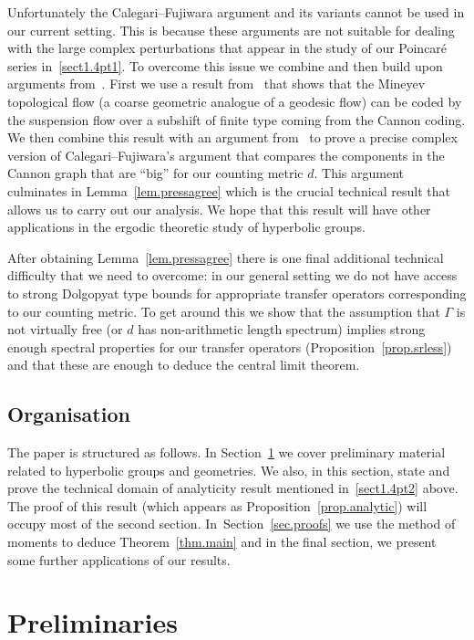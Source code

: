 \documentclass[10pt]{amsart}
\theoremstyle{definition}\newtheorem{defi}[theo]{Definition}\newtheorem{rema}[theo]{Remark}\newtheorem{exam}[theo]{Example}\newtheorem{exem}[theo]{Example}\newtheorem{nota}[theo]{Notation}
\newcommand{\G}{\Gamma}
\theoremstyle{plain}
\begin{document}
Unfortunately the Calegari--Fujiwara argument and its variants cannot be used in our current setting. This is because these arguments are not suitable for dealing with the large complex perturbations that appear in the study of our Poincaré series in~\eqref{sect1.4pt1}. To overcome this issue we combine and then build upon arguments from~\cite{cantrell,cantrell.tanaka.2}. First we use a result from~\cite{cantrell.tanaka.2} that shows that the Mineyev topological flow (a coarse geometric analogue of a geodesic flow) can be coded by the suspension flow over a subshift of finite type coming from the Cannon coding. We then combine this result with an argument from~\cite{cantrell} to prove a precise complex version of Calegari--Fujiwara's argument that compares the components in the {Cannon graph} that are ``big'' for our counting metric $d$. This argument culminates in Lemma~\ref{lem.pressagree} which is the crucial technical result that allows us to carry out our analysis. We hope that this result will have other applications in the ergodic theoretic study of hyperbolic groups.


After obtaining Lemma~\ref{lem.pressagree} there is one final additional technical difficulty that we need to overcome: in our general setting we do not have access to strong Dolgopyat type bounds for appropriate transfer operators corresponding to our counting metric. To get around this we show that the assumption that $\G$ is not virtually free (or $d$ has non-arithmetic length spectrum) implies strong enough spectral properties for our transfer operators (Proposition~\ref{prop.srless}) and that these are enough to deduce the central limit theorem.

\subsection*{Organisation}

The paper is structured as follows. In Section~\ref{sect2} we cover preliminary material related to hyperbolic groups and geometries. We also, in this section, state and prove the technical domain of analyticity result mentioned in~\eqref{sect1.4pt2} above. The proof of this result (which appears as Proposition~\ref{prop.analytic}) will occupy most of the second section. In~Section~\ref{sec.proofs} we use the method of moments to deduce Theorem~\ref{thm.main} and in the final section, we present some further applications of our results.



\section{Preliminaries}\label{sect2}
\end{document}
